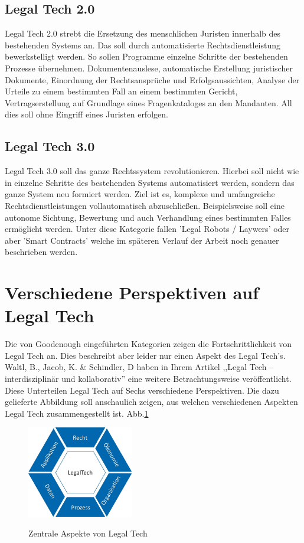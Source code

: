 \subsection{Legal Tech 2.0} \label{Legal Tech 2.0}
Legal Tech 2.0 strebt die Ersetzung des menschlichen Juristen innerhalb des bestehenden Systems an. Das soll durch automatisierte Rechtsdienstleistung bewerkstelligt werden. So sollen Programme einzelne Schritte der bestehenden Prozesse übernehmen. Dokumentenauslese, automatische Erstellung juristischer Dokumente, Einordnung der Rechtsansprüche und Erfolgsaussichten, Analyse der Urteile zu einem bestimmten Fall an einem bestimmten Gericht, Vertragserstellung auf Grundlage eines Fragenkataloges an den Mandanten. All dies soll ohne Eingriff eines Juristen erfolgen.

\subsection{Legal Tech 3.0} \label{Legal Tech 3.0}
Legal Tech 3.0 soll das ganze Rechtssystem revolutionieren. Hierbei soll nicht wie in  einzelne Schritte des bestehenden Systems automatisiert werden, sondern das ganze System neu formiert werden. Ziel ist es, komplexe und umfangreiche Rechtsdienstleistungen vollautomatisch abzuschließen. Beispielsweise soll eine autonome Sichtung, Bewertung und auch Verhandlung eines bestimmten Falles ermöglicht werden. Unter diese Kategorie fallen 'Legal Robots / Laywers' oder aber 'Smart Contracts' welche im späteren Verlauf der Arbeit noch genauer beschrieben werden.

\section{Verschiedene Perspektiven auf Legal Tech}
Die von Goodenough eingeführten Kategorien zeigen die Fortschrittlichkeit von Legal Tech an. Dies beschreibt aber leider nur einen Aspekt des Legal Tech's. Waltl, B., Jacob, K. \& Schindler, D haben in Ihrem Artikel ,,Legal Tech – interdisziplinär und kollaborativ'' eine weitere Betrachtungsweise veröffentlicht. Diese Unterteilen Legal Tech auf Sechs verschiedene Perspektiven. Die dazu gelieferte Abbildung soll anschaulich zeigen, aus welchen verschiedenen Aspekten Legal Tech zusammengestellt ist. Abb.\ref{img:Legal Tech – interdisziplinär und kollaborativ}

\begin{figure}
	\centering
	\includegraphics[height=4cm]{Bilder/35764_2020_300_Fig1_HTML.jpg}
	\caption{Zentrale Aspekte von Legal Tech }
	\cite{LegalTechKategorien}
	\label{img:Legal Tech – interdisziplinär und kollaborativ}
\end{figure}

